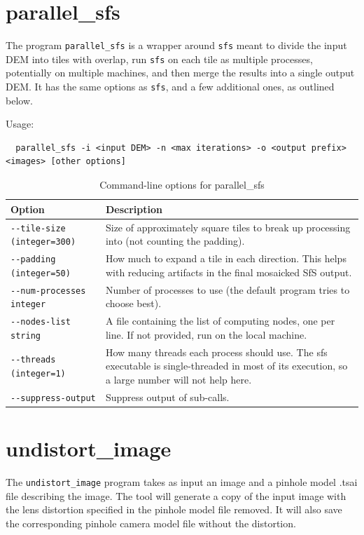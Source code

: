 \section{parallel\_sfs}
\label{psfs}

The program \texttt{parallel\_sfs} is a wrapper around \texttt{sfs}
meant to divide the input DEM into tiles with overlap, run \texttt{sfs} 
on each tile as multiple processes, potentially on multiple machines,
and then merge the results into a single output DEM. It has the same
options as \texttt{sfs}, and a few additional ones, as outlined below.

Usage:
\begin{verbatim}
  parallel_sfs -i <input DEM> -n <max iterations> -o <output prefix> <images> [other options]
\end{verbatim}

\begin{longtable}{|l|p{7.5cm}|}
\caption{Command-line options for parallel\_sfs}
\label{tbl:parallel_sfs}
\endfirsthead
\endhead
\endfoot
\endlastfoot
\hline
Option & Description \\ \hline \hline
\texttt{-\/-tile-size (integer=300)} & Size of approximately square tiles to break up processing into (not counting the padding).\\ \hline
\texttt{-\/-padding (integer=50)} & How much to expand a tile in each direction. This helps with reducing artifacts in the final mosaicked SfS output.\\ \hline
\texttt{-\/-num-processes integer} & Number of processes to use (the default program tries to choose best). \\ \hline
\texttt{-\/-nodes-list string} & A file containing the list of computing nodes, one per line. If not provided, run on the local machine.\\ \hline
\texttt{-\/-threads (integer=1)} & How many threads each process should use. The sfs executable is single-threaded in most of its execution, so a large number will not help here.\\ \hline
\texttt{-\/-suppress-output} & Suppress output of sub-calls.\\ \hline
\end{longtable}


\section{undistort\_image}
\label{undistortimage}

The \texttt{undistort\_image} program takes as input an image and a pinhole model .tsai file
describing the image.  The tool will generate a copy of the input image with the lens distortion
specified in the pinhole model file removed. It will also save the corresponding pinhole
camera model file without the distortion. 

